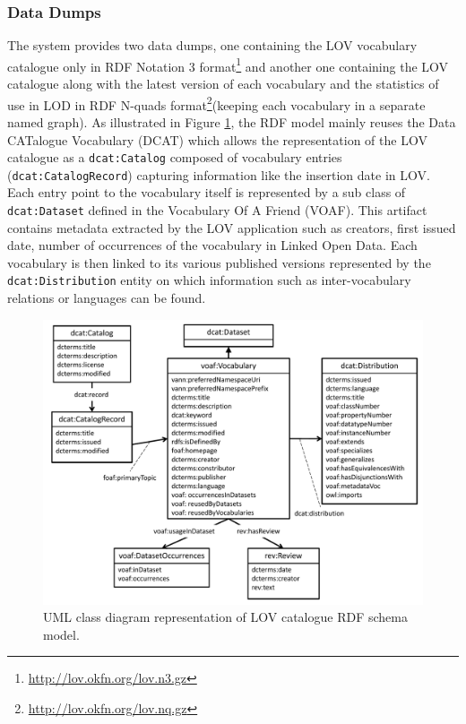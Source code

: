 \documentclass{iosart2c}
\begin{document}
\subsubsection{Data Dumps}
The system provides two data dumps, one containing the LOV vocabulary catalogue only in RDF Notation 3 format\footnote{\url{http://lov.okfn.org/lov.n3.gz}} and another one containing the LOV catalogue along with the latest version of each vocabulary and the statistics of use in LOD in RDF N-quads format\footnote{\url{http://lov.okfn.org/lov.nq.gz}}(keeping each vocabulary in a separate named graph). As illustrated in Figure \ref{fig:model}, the RDF model mainly reuses the Data CATalogue Vocabulary (DCAT) which allows the representation of the LOV catalogue as a {\small\texttt{dcat:Catalog}} composed of vocabulary entries ({\small\texttt{dcat:CatalogRecord}}) capturing information like the insertion date in LOV. Each entry point to the vocabulary itself is represented by a sub class of {\small\texttt{dcat:Dataset}} defined in the Vocabulary Of A Friend (VOAF). This artifact contains metadata extracted by the LOV application such as creators, first issued date, number of occurrences of the vocabulary in Linked Open Data. Each vocabulary is then linked to its various published versions represented by the {\small\texttt{dcat:Distribution}} entity on which information such as inter-vocabulary relations or languages can be found.

\begin{figure}[!htb]
\includegraphics[width=.9\textwidth]{LOV_model.pdf}
\caption{UML class diagram representation of LOV catalogue RDF schema model.}
\label{fig:model}
\end{figure}
\end{document}
